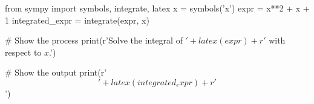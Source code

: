 \documentclass{article}
\begin{document}
\begin{pycode}
from sympy import symbols, integrate, latex
x = symbols('x')
expr = x**2 + x + 1
integrated_expr = integrate(expr, x)

# Show the process
print(r'Solve the integral of \( ' + latex(expr) + r' \) with respect to \( x \).')

# Show the output
print(r'\[' + latex(integrated_expr) + r'\]')
\end{pycode}
\end{document}
